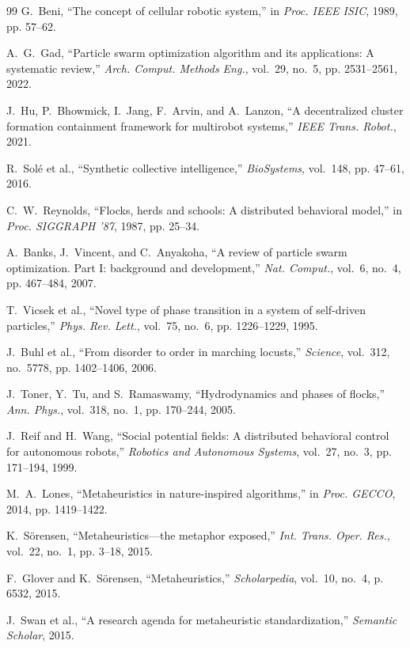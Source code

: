 \documentclass[letterpaper, 10pt, conference]{IEEEtran}
\begin{document}
\begin{thebibliography}{99}
G.~Beni, ``The concept of cellular robotic system,'' in \emph{Proc. IEEE ISIC}, 1989, pp. 57--62.

A.~G.~Gad, ``Particle swarm optimization algorithm and its applications: A systematic review,'' \emph{Arch. Comput. Methods Eng.}, vol.~29, no.~5, pp. 2531--2561, 2022.

J.~Hu, P.~Bhowmick, I.~Jang, F.~Arvin, and A.~Lanzon, ``A decentralized cluster formation containment framework for multirobot systems,'' \emph{IEEE Trans. Robot.}, 2021.

R.~Solé et al., ``Synthetic collective intelligence,'' \emph{BioSystems}, vol.~148, pp. 47--61, 2016.

C.~W.~Reynolds, ``Flocks, herds and schools: A distributed behavioral model,'' in \emph{Proc. SIGGRAPH '87}, 1987, pp. 25--34.

A.~Banks, J.~Vincent, and C.~Anyakoha, ``A review of particle swarm optimization. Part I: background and development,'' \emph{Nat. Comput.}, vol.~6, no.~4, pp. 467--484, 2007.

T.~Vicsek et al., ``Novel type of phase transition in a system of self-driven particles,'' \emph{Phys. Rev. Lett.}, vol.~75, no.~6, pp. 1226--1229, 1995.

J.~Buhl et al., ``From disorder to order in marching locusts,'' \emph{Science}, vol.~312, no.~5778, pp. 1402--1406, 2006.

J.~Toner, Y.~Tu, and S.~Ramaswamy, ``Hydrodynamics and phases of flocks,'' \emph{Ann. Phys.}, vol.~318, no.~1, pp. 170--244, 2005.

J.~Reif and H.~Wang, ``Social potential fields: A distributed behavioral control for autonomous robots,'' \emph{Robotics and Autonomous Systems}, vol.~27, no.~3, pp. 171--194, 1999.

M.~A.~Lones, ``Metaheuristics in nature-inspired algorithms,'' in \emph{Proc. GECCO}, 2014, pp. 1419--1422.

K.~Sörensen, ``Metaheuristics—the metaphor exposed,'' \emph{Int. Trans. Oper. Res.}, vol.~22, no.~1, pp. 3--18, 2015.

F.~Glover and K.~Sörensen, ``Metaheuristics,'' \emph{Scholarpedia}, vol.~10, no.~4, p. 6532, 2015.

J.~Swan et al., ``A research agenda for metaheuristic standardization,'' \emph{Semantic Scholar}, 2015.


\end{thebibliography}
\end{document}
